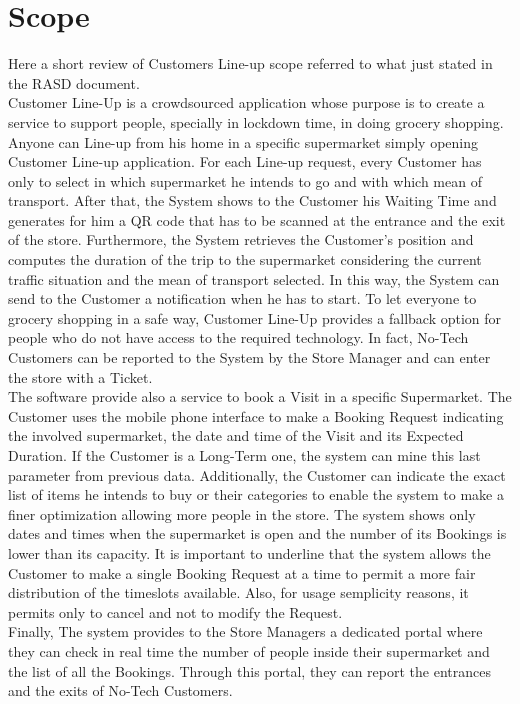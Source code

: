 \section{Scope}
Here a short review of Customers Line-up scope referred to what just stated in the RASD document.\\
Customer Line-Up is a crowdsourced application whose purpose is to create a service to support people, specially in lockdown time, in doing grocery shopping. Anyone can Line-up from his home in a specific supermarket simply opening Customer Line-up application. For each Line-up request, every Customer has only to select in which supermarket he intends to go and with which mean of transport. After that, the System shows to the Customer his Waiting Time and generates for him a QR code that has to be scanned at the entrance and the exit of the store.
Furthermore, the System retrieves the Customer’s position and computes the duration of the trip to the supermarket considering the current traffic situation and the mean of transport selected. In this way, the System can send to the Customer a notification when he has to start.
To let everyone to grocery shopping in a safe way, Customer Line-Up provides a fallback option for people who do not have access to the required technology. In fact, No-Tech Customers can be reported to the System by the Store Manager and can enter the store with a Ticket.\\
The software provide also a service to book a Visit in a specific Supermarket. The Customer uses the mobile phone interface to make a Booking Request indicating the involved supermarket, the date and time of the Visit and its Expected Duration. If the Customer is a Long-Term one, the system can mine this last parameter from previous data. Additionally, the Customer can indicate the exact list of items he intends to buy or their categories to enable the system to make a finer optimization allowing more people in the store. The system shows only dates and times when the supermarket is open and the number of its Bookings is lower than its capacity. It is important to underline that the system allows the Customer to make a single Booking Request at a time to permit a more fair distribution of the timeslots available. Also, for usage semplicity reasons, it permits only to cancel and not to modify the Request.\\
Finally, The system provides to the Store Managers a dedicated portal where they can check in real time the number of people inside their supermarket and the list of all the Bookings. Through this portal, they can report the entrances and the exits of No-Tech Customers.